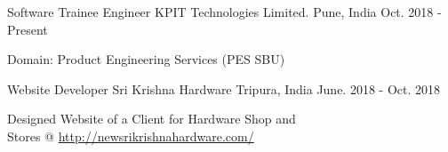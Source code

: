 \vspace{-15pt}
\vspace{-5pt}

\begin{cventries}

\cventry
{Software Trainee Engineer} %
{KPIT Technologies Limited.} %
{Pune, India} %
{Oct. 2018 - Present} %
{ %
	\begin{cvitems}
		\item {Domain: Product Engineering Services (PES SBU)}
	\end{cvitems}
}
\vspace{-18pt}
\cventry
{Website Developer} %
{Sri Krishna Hardware} %
{Tripura, India} %
{June. 2018 - Oct. 2018} %
{ %
	\begin{cvitems}
		\item {Designed Website of a Client for Hardware Shop and \\ Stores @ \url{http://newsrikrishnahardware.com/}}
	\end{cvitems}
}
\end{cventries}